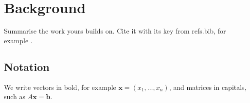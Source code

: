 \chapter{Background}\label{ch:background}

Summarise the work yours builds on. Cite it with its key from refs.bib, for
example \cite{lamport1986}.

\section{Notation}

We write vectors in bold, for example $\mathbf{x} = (x_1, \dots, x_n)$, and
matrices in capitals, such as $A\mathbf{x} = \mathbf{b}$.
